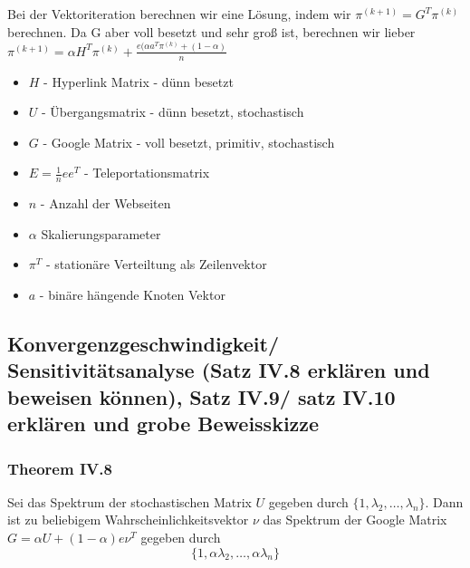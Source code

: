 \documentclass[]{article}
\begin{document}
Bei der Vektoriteration berechnen wir eine Lösung, indem wir $\pi^{(k+1)}=G^T \pi^{(k)}$ berechnen. Da G aber voll besetzt und sehr groß ist, berechnen wir lieber 
$\pi^{(k+1)} = \alpha H^T \pi^{(k)} + \frac{e (\alpha a^T \pi^{(k)} + (1- \alpha)}{n} $ 

\begin{itemize}
	\item $H$ - Hyperlink Matrix - dünn besetzt
	\item $U$ - Übergangsmatrix - dünn besetzt, stochastisch
	\item $G$ - Google Matrix - voll besetzt, primitiv, stochastisch
	\item $E = \frac{1}{n} e e^T$ - Teleportationsmatrix
	\item $n$ - Anzahl der Webseiten
	\item $\alpha$ Skalierungsparameter
	\item $\pi^T$ - stationäre Verteiltung als Zeilenvektor
	\item $a$ - binäre hängende Knoten Vektor
\end{itemize}

\subsection*{Konvergenzgeschwindigkeit/ Sensitivitätsanalyse (Satz IV.8 erklären und beweisen können), Satz IV.9/ satz IV.10 erklären und grobe Beweisskizze}

\subsubsection*{Theorem IV.8}
Sei das Spektrum der stochastischen Matrix $U$ gegeben durch $\{1, \lambda_2, \dotsc, \lambda_n \}$. Dann ist zu beliebigem Wahrscheinlichkeitsvektor $\nu$ das Spektrum der Google Matrix $G = \alpha U + (1- \alpha) e \nu^T$ gegeben durch
\[ \{1, \alpha \lambda_2, \dotsc, \alpha \lambda_n \} \]
\end{document}
